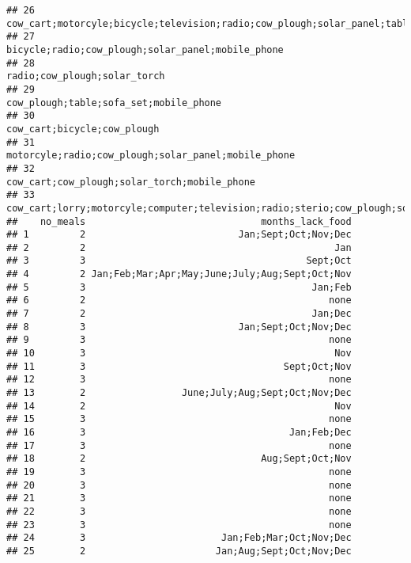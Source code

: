 \documentclass[
]{article}
\begin{document}
\begin{verbatim}
## 26                                 cow_cart;motorcyle;bicycle;television;radio;cow_plough;solar_panel;table;mobile_phone
## 27                                                                     bicycle;radio;cow_plough;solar_panel;mobile_phone
## 28                                                                                          radio;cow_plough;solar_torch
## 29                                                                                cow_plough;table;sofa_set;mobile_phone
## 30                                                                                           cow_cart;bicycle;cow_plough
## 31                                                                   motorcyle;radio;cow_plough;solar_panel;mobile_phone
## 32                                                                          cow_cart;cow_plough;solar_torch;mobile_phone
## 33 cow_cart;lorry;motorcyle;computer;television;radio;sterio;cow_plough;solar_panel;solar_torch;electricity;mobile_phone
##    no_meals                               months_lack_food
## 1         2                           Jan;Sept;Oct;Nov;Dec
## 2         2                                            Jan
## 3         3                                       Sept;Oct
## 4         2 Jan;Feb;Mar;Apr;May;June;July;Aug;Sept;Oct;Nov
## 5         3                                        Jan;Feb
## 6         2                                           none
## 7         2                                        Jan;Dec
## 8         3                           Jan;Sept;Oct;Nov;Dec
## 9         3                                           none
## 10        3                                            Nov
## 11        3                                   Sept;Oct;Nov
## 12        3                                           none
## 13        2                 June;July;Aug;Sept;Oct;Nov;Dec
## 14        2                                            Nov
## 15        3                                           none
## 16        3                                    Jan;Feb;Dec
## 17        3                                           none
## 18        2                               Aug;Sept;Oct;Nov
## 19        3                                           none
## 20        3                                           none
## 21        3                                           none
## 22        3                                           none
## 23        3                                           none
## 24        3                        Jan;Feb;Mar;Oct;Nov;Dec
## 25        2                       Jan;Aug;Sept;Oct;Nov;Dec

\end{verbatim}
\end{document}
